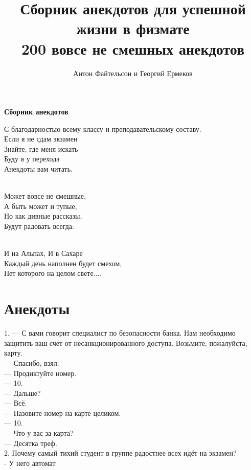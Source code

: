 \documentclass[a4paper,20pt,notitlepage]{extbook}
\title{Сборник анекдотов для успешной жизни в физмате\\ 200 вовсе не смешных анекдотов}
\author{Антон Файтельсон и Георгий Ермеков}
\begin{document}
	\date{}
	\begin{titlepage} 
		
		\begin{flushleft}
		{\bf \Large 
			Сборник анекдотов }%
			
			\indent
			
			С благодарностью всему классу и преподавательскому составу.\\
			
			Если я не сдам экзамен\\
			Знайте, где меня искать \\ 
			Буду я у перехода\\
			Анекдоты вам читать.\\
			~
			
			Может вовсе не смешные,\\
			А быть может и тупые, \\
			Но как дивные рассказы,\\
			Будут радовать всегда:\\
			~
			
			И на Альпах, И в Сахаре \\
			Каждый день наполнен будет смехом,\\
			Нет которого на целом свете....\\
			
			
		\end{flushleft}
	\end{titlepage}
	
	\section*{Анекдоты}
	
	1. — С вами говорит специалист по безопасности банка. Нам необходимо защитить ваш счет от несанкционированного доступа. Возьмите, пожалуйста, карту.\\
	— Спасибо, взял.\\
	— Продиктуйте номер.\\
	— 10.\\
	— Дальше?\\
	— Всё.\\
	— Назовите номер на карте целиком.\\
	— 10.\\
	— Что у вас за карта?\\
	— Десятка треф.\\
	2.  Почему самый тихий студент в группе радостнее всех идёт на экзамен?\\
	- У него автомат\\
	
\end{document}
